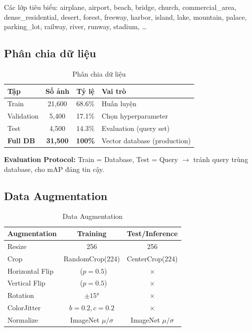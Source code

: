 \documentclass[13pt,a4paper]{article}
\newcommand{\tmark}{\checkmark}
\newcommand{\xmark}{$\times$}
\begin{document}
Các lớp tiêu biểu: airplane, airport, beach, bridge, church, commercial\_area, dense\_residential, desert, forest, freeway, harbor, island, lake, mountain, palace, parking\_lot, railway, river, runway, stadium, \ldots

\subsection{Phân chia dữ liệu}

\begin{table}[H]
\centering
\caption{Phân chia dữ liệu}
\label{tab:data_split}
\begin{tabular}{lccl}
\toprule
\textbf{Tập} & \textbf{Số ảnh} & \textbf{Tỷ lệ} & \textbf{Vai trò} \\
\midrule
Train       & 21{,}600  & 68.6\%  & Huấn luyện \\
Validation  & 5{,}400   & 17.1\%  & Chọn hyperparameter \\
Test        & 4{,}500   & 14.3\%  & Evaluation (query set) \\
\midrule
\textbf{Full DB} & \textbf{31{,}500} & \textbf{100\%} & Vector database (production) \\
\bottomrule
\end{tabular}
\end{table}

\textbf{Evaluation Protocol:} Train = Database, Test = Query $\to$ tránh query trùng database, cho mAP đáng tin cậy.

\subsection{Data Augmentation}

\begin{table}[H]
\centering
\caption{Data Augmentation}
\label{tab:augmentation}
\begin{tabular}{lcc}
\toprule
\textbf{Augmentation} & \textbf{Training} & \textbf{Test/Inference} \\
\midrule
Resize                  & 256         & 256 \\
Crop                    & RandomCrop(224) & CenterCrop(224) \\
Horizontal Flip         & \tmark~($p=0.5$) & \xmark \\
Vertical Flip           & \tmark~($p=0.5$) & \xmark \\
Rotation                & $\pm 15°$   & \xmark \\
ColorJitter             & $b=0.2, c=0.2$ & \xmark \\
Normalize               & ImageNet $\mu/\sigma$ & ImageNet $\mu/\sigma$ \\
\bottomrule
\end{tabular}
\end{table}
\end{document}
